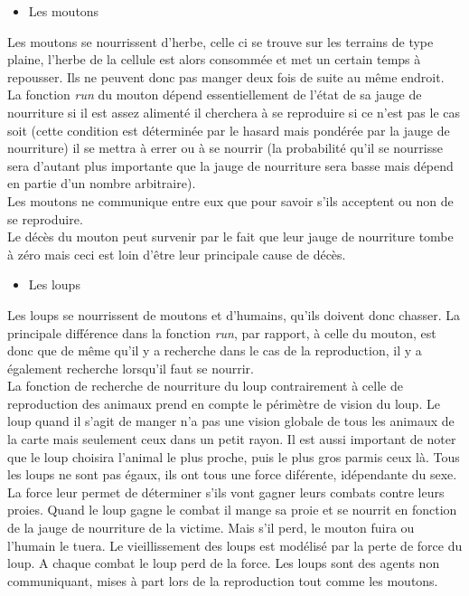 \documentclass[12pt]{article}
\begin{document}
\begin{itemize}
		\begin{itemize}
		\item Les moutons\\
		\end{itemize}

Les moutons se nourrissent d'herbe, celle ci se trouve sur les terrains de type
plaine, l'herbe de la cellule est alors consommée et met un certain temps à
repousser. Ils ne peuvent donc pas manger deux fois de suite au même endroit.\\

La fonction \textit{run} du mouton dépend essentiellement de l'état de sa
jauge de nourriture si il est assez alimenté il cherchera à se reproduire
si ce n'est pas le cas soit (cette condition est déterminée par le hasard mais
pondérée par la jauge de nourriture) il se mettra à errer ou à se nourrir (la
probabilité qu'il se nourrisse sera d'autant plus importante que la jauge de
nourriture sera basse mais dépend en partie d'un nombre arbitraire).\\

Les moutons ne communique entre eux que pour savoir s'ils acceptent ou non de 
se reproduire.\\

Le décès du mouton peut survenir par le fait que leur jauge de nourriture 
tombe à zéro mais ceci est loin d'être leur principale cause de décès.\\

		\begin{itemize}
		\item Les loups\\
		\end{itemize}

Les loups se nourrissent de moutons et d'humains, qu'ils doivent donc chasser. La 
principale différence dans la fonction \textit{run}, par rapport, à celle du 
mouton, est donc que de même qu'il y a recherche dans le cas de la 
reproduction, il y a également recherche lorsqu'il faut se nourrir.\\

La fonction de recherche de nourriture du loup contrairement à celle de 
reproduction des animaux prend en compte le périmètre de vision du loup. Le 
loup quand il s'agit de manger n'a pas une vision globale de tous les animaux 
de la carte mais seulement ceux dans un petit rayon. Il est aussi important de 
noter que le loup choisira l'animal le plus proche, puis le plus gros parmis 
ceux là. Tous les loups ne sont pas égaux, ils ont tous une force diférente, 
idépendante du sexe. La force leur permet de déterminer s'ils vont gagner 
leurs combats contre leurs proies. Quand le loup gagne le combat il mange sa 
proie et se nourrit en fonction de la jauge de nourriture de la victime. Mais 
s'il perd, le mouton fuira ou l'humain le tuera. Le vieillissement des loups 
est modélisé par la perte de force du loup. A chaque combat le loup perd de la 
force. Les loups sont des agents non communiquant, mises à part lors de la 
reproduction tout comme les moutons.\\


\end{itemize}
\end{document}
